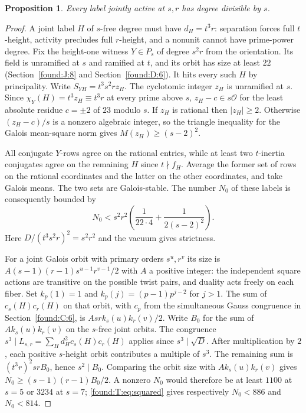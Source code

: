 \documentclass[11pt,a4paper]{article}
\numberwithin{equation}{section}
\newtheorem{proposition}[theorem]{Proposition}
\theoremstyle{remark}
\begin{document}
\begin{proposition}\label{found:T:10.1}\label{found:T:key:pr:joint-positive}
Every label jointly active at $s,r$ has degree divisible by $s$.
\end{proposition}
\begin{proof}
A joint label $H$ of $s$-free degree must have $d_H=t^3r$:
separation forces full $t$-height, activity precludes full
$r$-height, and a nonunit cannot have prime-power degree. Fix
the height-one witness $Y\in P_s$ of degree $s^2r$ from the
orientation. Its field is unramified at $s$ and ramified at $t$,
and its orbit has size at least $22$ (Section~\ref{found:J:8} and Section~\ref{found:D:6}).
It hits every such $H$ by principality. Write
$S_{YH}=t^3s^2 r z_H$. The cyclotomic integer $z_H$ is unramified
at $s$. Since $\chi_Y(H)=t^3z_H\equiv t^3r$ at every prime above
$s$, $z_H-c\in s\mathcal O$ for the least absolute residue
$c=\pm2$ of $23$ modulo $s$. If $z_H$ is rational then
$|z_H|\ge2$. Otherwise $(z_H-c)/s$ is a nonzero algebraic integer,
so the triangle inequality for the Galois mean-square norm gives
$M(z_H)\ge(s-2)^2$.

All conjugate $Y$-rows agree on the rational entries, while at
least two $t$-inertia conjugates agree on the remaining $H$ since
$t\nmid f_H$. Average the former set of rows on the rational
coordinates and the latter on the other coordinates, and take
Galois means. The two sets are Galois-stable. The number $N_0$ of
these labels is consequently bounded by
\begin{equation}\label{found:T:eq:squared}
 N_0<s^2r^2\left(\frac1{22\cdot4}+\frac1{2(s-2)^2}\right).
\end{equation}
Here $D/(t^3s^2r)^2=s^2r^2$ and the vacuum gives strictness.

For a joint Galois orbit with primary orders $s^u,r^v$ its size is
$A(s-1)(r-1)s^{u-1}r^{v-1}/2$ with $A$ a positive integer:
the independent square actions are transitive on the possible
twist pairs, and duality acts freely on each fiber. Set
$k_p(1)=1$ and $k_p(j)=(p-1)p^{j-2}$ for $j>1$. The sum of
$c_s(H)c_r(H)$ on that orbit, with $c_p$ from the simultaneous Gauss congruence in Section~\ref{found:C:6}, is
$Asr k_s(u)k_r(v)/2$. Write $B_0$ for the sum of
$A k_s(u)k_r(v)$ on the $s$-free joint orbits. The congruence
$s^3\mid L_{s,r}=\sum_H d_H^2c_s(H)c_r(H)$ applies since
$s^3\mid\sqrt D$. After multiplication by $2$, each positive
$s$-height orbit contributes a multiple of $s^3$. The remaining
sum is $(t^3r)^2srB_0$, hence $s^2\mid B_0$. Comparing the
orbit size with $A k_s(u)k_r(v)$ gives
$N_0\ge (s-1)(r-1)B_0/2$. A nonzero $N_0$ would therefore be at
least $1100$ at $s=5$ or $3234$ at $s=7$; \eqref{found:T:eq:squared} gives respectively
$N_0<886$ and $N_0<814$.
\end{proof}
\end{document}
